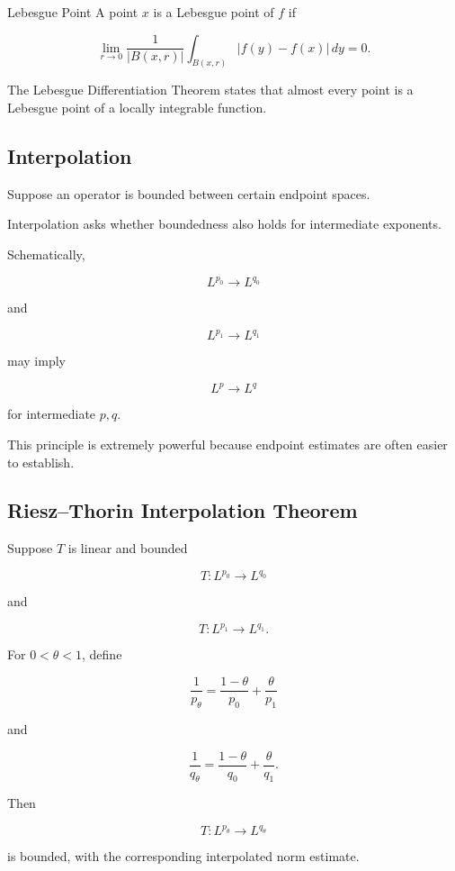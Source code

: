 \begin{definitionbox}{Lebesgue Point}
A point \(x\) is a Lebesgue point of \(f\) if

\[
\boxed{
\lim_{r\to0}
\frac{1}{|B(x,r)|}
\int_{B(x,r)}
|f(y)-f(x)|\,dy
=
0.
}
\]
\end{definitionbox}

The Lebesgue Differentiation Theorem states that almost every point is a
Lebesgue point of a locally integrable function.

\subsection{Interpolation}
\label{subsec:harmonic-interpolation}

Suppose an operator is bounded between certain endpoint spaces.

Interpolation asks whether boundedness also holds for intermediate
exponents.

Schematically,

\[
\boxed{
L^{p_0}\to L^{q_0}
}
\]

and

\[
\boxed{
L^{p_1}\to L^{q_1}
}
\]

may imply

\[
\boxed{
L^p\to L^q
}
\]

for intermediate \(p,q\).

This principle is extremely powerful because endpoint estimates are often
easier to establish.

\subsection{Riesz--Thorin Interpolation Theorem}
\label{subsec:riesz-thorin}

\begin{theorem}
Suppose \(T\) is linear and bounded

\[
T:L^{p_0}\to L^{q_0}
\]

and

\[
T:L^{p_1}\to L^{q_1}.
\]

For \(0<\theta<1\), define

\[
\boxed{
\frac1{p_\theta}
=
\frac{1-\theta}{p_0}
+
\frac{\theta}{p_1}
}
\]

and

\[
\boxed{
\frac1{q_\theta}
=
\frac{1-\theta}{q_0}
+
\frac{\theta}{q_1}.
}
\]

Then

\[
\boxed{
T:L^{p_\theta}\to L^{q_\theta}
}
\]

is bounded, with the corresponding interpolated norm estimate.
\end{theorem}

